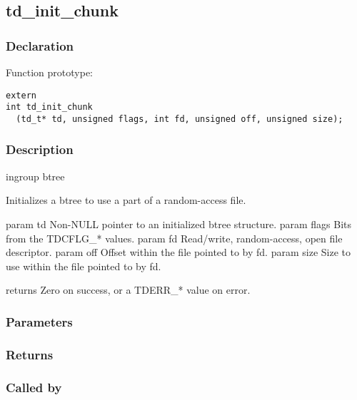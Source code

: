 
\newpage
\subsection{td\_init\_chunk}
\subsubsection{Declaration} Function prototype:

\begin{verbatim}
extern
int td_init_chunk
  (td_t* td, unsigned flags, int fd, unsigned off, unsigned size);
\end{verbatim}

\subsubsection{Description}


 ingroup btree

 Initializes a btree to use a part of a random-access file.

 param td Non-NULL pointer to an initialized btree structure.
 param flags Bits from the TDCFLG\_* values.
 param fd Read/write, random-access, open file descriptor.
 param off Offset within the file pointed to by fd.
 param size Size to use within the file pointed to by fd.

 returns Zero on success, or a TDERR\_* value on error.
 

\subsubsection{Parameters}
\subsubsection{Returns}
\subsubsection{Called by}
